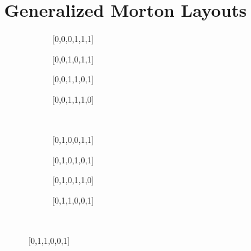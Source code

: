 \section{Generalized Morton Layouts}

\label{sec:bijections}

\begin{figure}
\begin{subfigure}{0.25\columnwidth}\centering{}\vspace{-1.5mm}\caption{[0,0,0,1,1,1]}\vspace{1.5mm}\label{fig:layouts8x8:000111}\end{subfigure}\hfill
\begin{subfigure}{0.25\columnwidth}\centering{}\vspace{-1.5mm}\caption{[0,0,1,0,1,1]}\vspace{1.5mm}\end{subfigure}\hfill
\begin{subfigure}{0.25\columnwidth}\centering{}\vspace{-1.5mm}\caption{[0,0,1,1,0,1]}\vspace{1.5mm}\end{subfigure}\hfill
\begin{subfigure}{0.25\columnwidth}\centering{}\vspace{-1.5mm}\caption{[0,0,1,1,1,0]}\vspace{1.5mm}\end{subfigure}\\
\begin{subfigure}{0.25\columnwidth}\centering{}\vspace{-1.5mm}\caption{[0,1,0,0,1,1]}\vspace{1.5mm}\end{subfigure}\hfill
\begin{subfigure}{0.25\columnwidth}\centering{}\vspace{-1.5mm}\caption{[0,1,0,1,0,1]}\vspace{1.5mm}\label{fig:layouts8x8:010101}\end{subfigure}\hfill
\begin{subfigure}{0.25\columnwidth}\centering{}\vspace{-1.5mm}\caption{[0,1,0,1,1,0]}\vspace{1.5mm}\end{subfigure}\hfill
\begin{subfigure}{0.25\columnwidth}\centering{}\vspace{-1.5mm}\caption{[0,1,1,0,0,1]}\vspace{1.5mm}\end{subfigure}\\

\end{figure}
